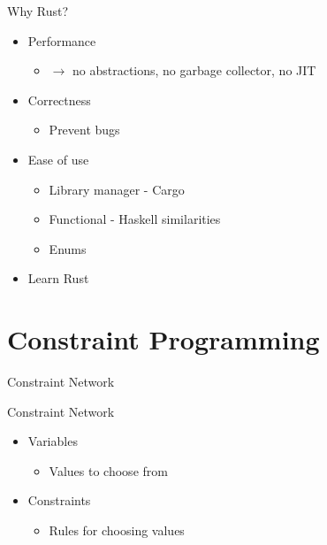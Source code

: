 \documentclass[mathserif,table]{gkibeamer-aaai}
\begin{document}
\begin{frame}{Why Rust?}
	\begin{itemize}
		\item Performance
		      \begin{itemize}
			      \item $\rightarrow$ no abstractions, no garbage collector, no JIT
		      \end{itemize}
		\item Correctness
		      \begin{itemize}
			      \item Prevent bugs
		      \end{itemize}
		      \pause
		\item Ease of use
		      \begin{itemize}
			      \item Library manager - Cargo
			            \pause
			      \item Functional - Haskell similarities
			            \pause
			      \item Enums
			            \pause
		      \end{itemize}
		\item Learn Rust
	\end{itemize}
\end{frame}

\section{Constraint Programming}

\begin{frame}
\end{frame}

\begin{frame}
	\begin{center}
		\LARGE{Constraint Network}
	\end{center}
\end{frame}

\begin{frame}{Constraint Network}
	\begin{itemize}
		\item Variables
		      \begin{itemize}
			      \item Values to choose from
		      \end{itemize}
		\item Constraints
		      \begin{itemize}
			      \item Rules for choosing values
		      \end{itemize}
	\end{itemize}
\end{frame}
\end{document}
